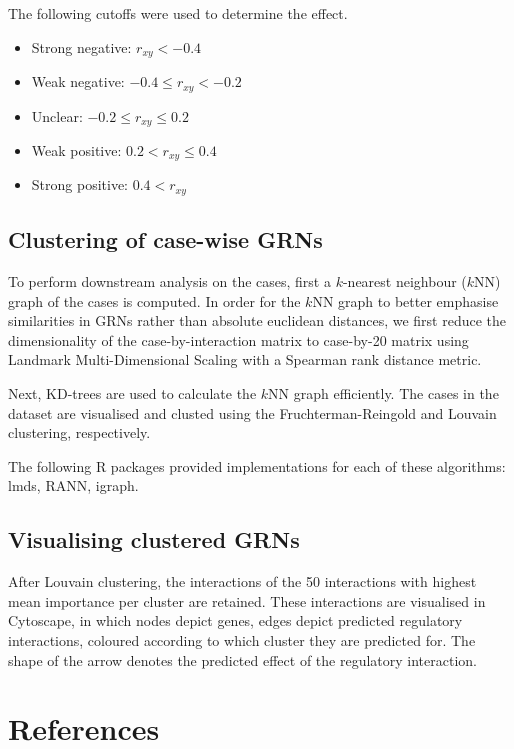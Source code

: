 The following cutoffs were used to determine the effect. 

\begin{itemize}
	\item Strong negative: $r_{xy} < -0.4$
  \item Weak negative: $-0.4 \leq r_{xy} < -0.2$
  \item Unclear: $-0.2 \leq r_{xy} \leq 0.2$
  \item Weak positive: $0.2 < r_{xy} \leq 0.4$
  \item Strong positive: $0.4 < r_{xy}$
\end{itemize} 

\subsection{Clustering of case-wise GRNs}
To perform downstream analysis on the cases, first a $k$-nearest neighbour ($k$NN) graph of the cases is computed.
In order for the $k$NN graph to better emphasise similarities in GRNs rather than absolute euclidean distances, we first reduce the dimensionality of the case-by-interaction matrix to case-by-20 matrix using Landmark Multi-Dimensional Scaling\cite{lee_landmarkmdsensemble_2009} with a Spearman rank distance metric.  

Next, KD-trees are used to calculate the $k$NN graph efficiently. The cases in the dataset are visualised and clusted using the Fruchterman-Reingold\cite{fruchterman_graphdrawingforcedirected_1991} and Louvain clustering\cite{blondel_fastunfoldingcommunities_2008}, respectively.

The following R packages provided implementations for each of these algorithms: lmds, RANN, igraph\cite{csardi_igraphsoftwarepackage_2006}.

\subsection{Visualising clustered GRNs}
After Louvain clustering, the interactions of the 50 interactions with highest mean importance per cluster are retained. These interactions are visualised in Cytoscape\cite{shannon_cytoscapesoftwareenvironment_2003}, in which nodes depict genes, edges depict predicted regulatory interactions, coloured according to which cluster they are predicted for. The shape of the arrow denotes the predicted effect of the regulatory interaction.

%

\clearpage
\section{References}
\printbibliography[heading=none]
